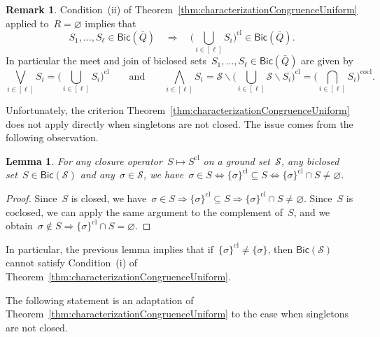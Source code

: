 \documentclass{memo-l}
\newtheorem{lemma}[theorem]{Lemma}
\theoremstyle{definition}
\newtheorem{remark}[theorem]{Remark}
\newcommand{\cS}{\mathcal{S}} %
\newcommand{\ssm}{\smallsetminus} %
\newcommand{\bigMeet}{\bigwedge} %
\newcommand{\bigJoin}{\bigvee} %
\newcommand{\closure}[1]{#1^{\mathrm{cl}}} %
\newcommand{\coclosure}[1]{#1^{\mathrm{cocl}}} %
\newcommand{\Bicl}[1]{\mathsf{Bic}(#1)} %
\begin{document}
\begin{remark}
\label{rem:meetJoinBiclosedSets}
Condition~(ii) of Theorem~\ref{thm:characterizationCongruenceUniform} applied to~$R = \varnothing$ implies that
\[
S_1, \dots, S_\ell \in \Bicl{\bar Q} \quad \Longrightarrow \quad \closure{\Big( \bigcup_{i \in [\ell]} S_i \Big)} \in \Bicl{\bar Q}.
\]
In particular the meet and join of biclosed sets~$S_1, \dots, S_\ell \in \Bicl{\bar Q}$ are given by
\[
\bigJoin_{i \in [\ell]} S_i = \closure{\Big( \bigcup_{i \in [\ell]} S_i \Big)}
\qquad\text{and}\qquad
\bigMeet_{i \in [\ell]} S_i = \cS \ssm \closure{\Big( \bigcup_{i \in [\ell]} \cS \ssm S_i \Big)} = \coclosure{\Big( \bigcap_{i \in [\ell]} S_i \Big)}.
\]
\end{remark}

\medskip
Unfortunately, the criterion Theorem~\ref{thm:characterizationCongruenceUniform} does not apply directly when singletons are not closed.
The issue comes from the following observation.

\begin{lemma}
\label{lem:loops}
For any closure operator~$S \mapsto \closure{S}$ on a ground set~$\cS$, any biclosed set~$S \in \Bicl{\cS}$ and any~$\sigma \in \cS$, we have~$\sigma \in S \iff \closure{\{\sigma\}} \subseteq S \iff \closure{\{\sigma\}} \cap S \ne \varnothing$.
\end{lemma}

\begin{proof}
Since~$S$ is closed, we have~$\sigma \in S \Longrightarrow \closure{\{\sigma\}} \subseteq S \Longrightarrow \closure{\{\sigma\}} \cap S \ne \varnothing$.
Since~$S$ is coclosed, we can apply the same argument to the complement of~$S$, and we obtain~$\sigma \notin S \Longrightarrow \closure{\{\sigma\}} \cap S = \varnothing$.
\end{proof}

In particular, the previous lemma implies that if~$\closure{\{\sigma\}} \ne \{\sigma\}$, then $\Bicl{\cS}$ cannot satisfy Condition~(i) of Theorem~\ref{thm:characterizationCongruenceUniform}.

The following statement is an adaptation of Theorem~\ref{thm:characterizationCongruenceUniform} to the case when singletons are not closed.
\end{document}
